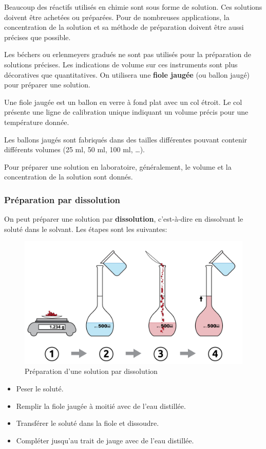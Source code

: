 \documentclass[
  11pt,
  a4paper,
  openany]{book}
\providecommand{\tightlist}{%
  \setlength{\itemsep}{0pt}\setlength{\parskip}{0pt}}
\begin{document}
Beaucoup des réactifs utilisés en chimie sont sous forme de solution. Ces solutions doivent être achetées ou préparées. Pour de nombreuses applications, la concentration de la solution et sa méthode de préparation doivent être aussi précises que possible.

Les béchers ou erlenmeyers gradués ne sont pas utilisés pour la préparation de solutions précises. Les indications de volume sur ces instruments sont plus décoratives que quantitatives. On utilisera une \textbf{fiole jaugée} (ou ballon jaugé) pour préparer une solution.

Une fiole jaugée est un ballon en verre à fond plat avec un col étroit. Le col présente une ligne de calibration unique indiquant un volume précis pour une température donnée.

Les ballons jaugés sont fabriqués dans des tailles différentes pouvant contenir différents volumes (25 ml, 50 ml, 100 ml, \ldots).

Pour préparer une solution en laboratoire, généralement, le volume et la concentration de la solution sont donnés.

\newpage

\hypertarget{pruxe9paration-par-dissolution}{%
\subsubsection{Préparation par dissolution}\label{pruxe9paration-par-dissolution}}

On peut préparer une solution par \textbf{dissolution}, c'est-à-dire en dissolvant le soluté dans le solvant. Les étapes sont les suivantes:

\begin{figure}

{\centering \includegraphics[width=0.5\linewidth]{images/preparation-1} 

}

\caption{Préparation d'une solution par dissolution}\label{fig:preparation-1}
\end{figure}

\begin{itemize}
\tightlist
\item
  Peser le soluté.
\item
  Remplir la fiole jaugée à moitié avec de l'eau distillée.
\item
  Transférer le soluté dans la fiole et dissoudre.
\item
  Compléter jusqu'au trait de jauge avec de l'eau distillée.
\end{itemize}
\end{document}
